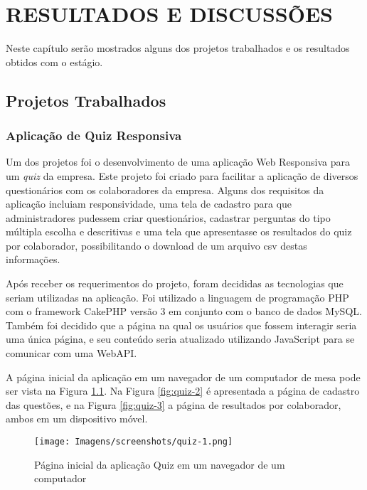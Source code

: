 \chapter{RESULTADOS E DISCUSSÕES} \label{cap:result}

Neste capítulo serão mostrados alguns dos projetos trabalhados e os resultados obtidos com o estágio.

\section{Projetos Trabalhados}

\subsection{Aplicação de Quiz Responsiva}

Um dos projetos foi o desenvolvimento de uma aplicação Web Responsiva para um \textit{quiz} da empresa. Este projeto foi criado para facilitar a aplicação de diversos questionários com os colaboradores da empresa. Alguns dos requisitos da aplicação incluiam responsividade, uma tela de cadastro para que administradores pudessem criar questionários, cadastrar perguntas do tipo múltipla escolha e descritivas e uma tela que apresentasse os resultados do quiz por colaborador, possibilitando o download de um arquivo csv destas informações.

Após receber os requerimentos do projeto, foram decididas as tecnologias que seriam utilizadas na aplicação. Foi utilizado a linguagem de programação PHP com o framework CakePHP versão 3 em conjunto com o banco de dados MySQL. Também foi decidido que a página na qual os usuários que fossem interagir seria uma única página, e seu conteúdo seria atualizado utilizando JavaScript para se comunicar com uma WebAPI.

A página inicial da aplicação em um navegador de um computador de mesa pode ser vista na Figura \ref{fig:quiz-1}. Na Figura \ref{fig:quiz-2} é apresentada a página de cadastro das questões, e na Figura \ref{fig:quiz-3} a página de resultados por colaborador, ambos em um dispositivo móvel.

\begin{figure}[htbp!]
  \centering
  \texttt{[image: Imagens/screenshots/quiz-1.png]}
  \caption{Página inicial da aplicação Quiz em um navegador de um computador}
  \label{fig:quiz-1}
\end{figure}


